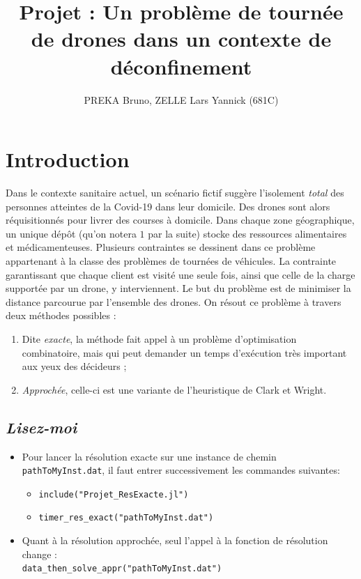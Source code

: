 \documentclass[french, 11pt, a4paper]{article} %
\title{Projet : Un problème de tournée de drones dans un contexte de déconfinement}
\author{PREKA Bruno, ZELLE Lars Yannick (681C)}
\newcommand{\smb}{\smallbreak}
\begin{document}
\maketitle



\section{Introduction}

Dans le contexte sanitaire actuel, un scénario fictif suggère l'isolement \emph{total} des personnes
atteintes de la Covid-19 dans leur domicile. Des drones sont alors réquisitionnés pour livrer des courses
à domicile.
\smb Dans chaque zone géographique, un unique dépôt (qu'on notera $1$ par la suite) stocke des ressources alimentaires et médicamenteuses.
Plusieurs contraintes se dessinent dans ce problème appartenant à la classe des problèmes de tournées de véhicules.
La contrainte garantissant que chaque client est visité une seule fois, ainsi que celle de la charge supportée par un drone,
y interviennent.
Le but du problème est de minimiser la distance parcourue par l'ensemble des drones.
\smb On résout ce problème à travers deux méthodes possibles :
\vspace{-0.2cm}
\begin{enumerate}
    \item Dite \emph{exacte}, la méthode fait appel à un problème d'optimisation
combinatoire, mais qui peut demander un temps d'exécution très important aux yeux des décideurs ;
    \item \emph{Approchée}, celle-ci est une variante de l'heuristique de Clark et Wright.
\end{enumerate}

\subsection{\emph{Lisez-moi}}
\begin{itemize}
    \item Pour lancer la résolution exacte sur une instance de chemin \verb+pathToMyInst.dat+, il faut entrer successivement
    les commandes suivantes:
        \begin{itemize}
            \item \verb+include("Projet_ResExacte.jl")+
            \item \verb+timer_res_exact("pathToMyInst.dat")+
        \end{itemize}
    \item Quant à la résolution approchée, seul l'appel à la fonction de résolution change : \\ \verb+data_then_solve_appr("pathToMyInst.dat")+
\end{itemize}
\end{document}

